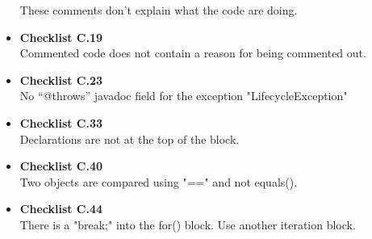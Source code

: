 \documentclass[../../../../codeInspection.tex]{subfiles}
\begin{document}
\begin{itemize}
		    	  These comments don't explain what the code are doing.

		    \item \textbf{Checklist C.19} \\

		    	  

		    	  

		    	  

		    	  Commented code does not contain a reason for being commented out.

		    \item \textbf{Checklist C.23} \\

		          

		          No “@throws” javadoc field for the exception "LifecycleException"

		    \item \textbf{Checklist C.33} \\

		    	  

		    	  Declarations are not at the top of the block.

		    \item \textbf{Checklist C.40} \\

		          

		          Two objects are compared using "==" and not equals().

		    \item \textbf{Checklist C.44} \\

		          

		          There is a "break;" into the for() block. Use another iteration block.

		          


\end{itemize}
\end{document}
